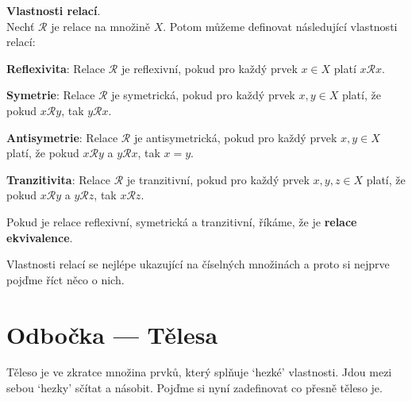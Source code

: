 \begin{definitionbox}
  \textbf{Vlastnosti relací}. \\
    Nechť $\mathcal R$ je relace na množině $X$. Potom můžeme definovat následující vlastnosti relací: \vspace{5mm}

    \textbf{Reflexivita}: Relace $\mathcal R$ je reflexivní, pokud pro každý prvek $x\in X$ platí $x\mathcal Rx$.\ \vspace{1mm}

    \textbf{Symetrie}: Relace $\mathcal R$ je symetrická, pokud pro každý prvek $x, y\in X$ platí, že pokud $x\mathcal Ry$, tak $y\mathcal Rx$.\ \vspace{1mm}

    \textbf{Antisymetrie}: Relace $\mathcal R$ je antisymetrická, pokud pro každý prvek $x, y\in X$ platí, že pokud $x\mathcal Ry$ a $y\mathcal Rx$, tak $x = y$.\ \vspace{1mm}

    \textbf{Tranzitivita}: Relace $\mathcal R$ je tranzitivní, pokud pro každý prvek $x, y, z\in X$ platí, že pokud $x\mathcal Ry$ a $y\mathcal Rz$, tak $x\mathcal Rz$.\ \vspace{1mm}

  Pokud je relace reflexivní, symetrická a tranzitivní, říkáme, že je \textbf{relace ekvivalence}.
\end{definitionbox}

Vlastnosti relací se nejlépe ukazující na číselných množinách a proto si nejprve pojďme říct něco o nich.

\section{Odbočka --- Tělesa}
Těleso je ve zkratce množina prvků, který splňuje  `hezké' vlastnosti. Jdou mezi sebou `hezky' sčítat a násobit. Pojďme si nyní zadefinovat co přesně těleso je.

